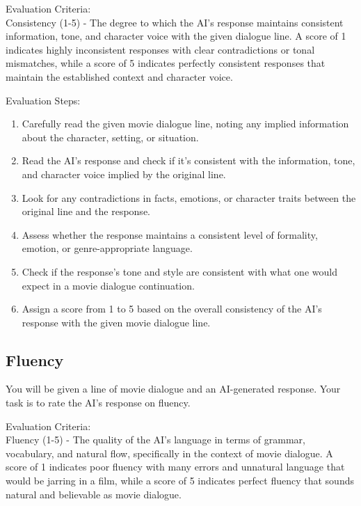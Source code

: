 \documentclass[stu,donotrepeattitle,floatsintext]{apa7}
\begin{document}
\begin{appendices}
        \bigskip
        \noindent Evaluation Criteria:\\
        \noindent Consistency (1-5) - The degree to which the AI's response maintains consistent information, tone, and character voice with the given dialogue line. A score of 1 indicates highly inconsistent responses with clear contradictions or tonal mismatches, while a score of 5 indicates perfectly consistent responses that maintain the established context and character voice.

        \bigskip
        \noindent Evaluation Steps:
        \begin{enumerate}
            \item Carefully read the given movie dialogue line, noting any implied information about the character, setting, or situation.
            \item Read the AI's response and check if it's consistent with the information, tone, and character voice implied by the original line.
            \item Look for any contradictions in facts, emotions, or character traits between the original line and the response.
            \item Assess whether the response maintains a consistent level of formality, emotion, or genre-appropriate language.
            \item Check if the response's tone and style are consistent with what one would expect in a movie dialogue continuation.
            \item Assign a score from 1 to 5 based on the overall consistency of the AI's response with the given movie dialogue line.
        \end{enumerate}

        \subsection{Fluency}

        \noindent You will be given a line of movie dialogue and an AI-generated response. Your task is to rate the AI's response on fluency.

        \bigskip
        \noindent Evaluation Criteria:\\
        \noindent Fluency (1-5) - The quality of the AI's language in terms of grammar, vocabulary, and natural flow, specifically in the context of movie dialogue. A score of 1 indicates poor fluency with many errors and unnatural language that would be jarring in a film, while a score of 5 indicates perfect fluency that sounds natural and believable as movie dialogue.


\end{appendices}
\end{document}
